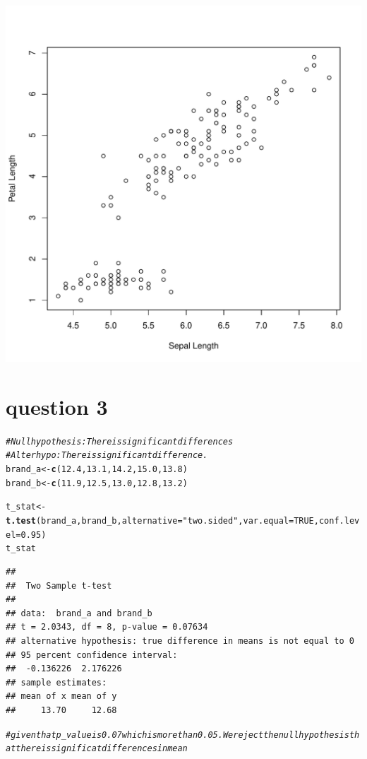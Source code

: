 \documentclass{article}\usepackage[]{graphicx}\usepackage[]{xcolor}
\makeatletter
\def\maxwidth{ %
  \ifdim\Gin@nat@width>\linewidth
    \linewidth
  \else
    \Gin@nat@width
  \fi
}
\newcommand{\hlnum}[1]{\textcolor[rgb]{0.686,0.059,0.569}{#1}}%
\newcommand{\hlsng}[1]{\textcolor[rgb]{0.192,0.494,0.8}{#1}}%
\newcommand{\hlcom}[1]{\textcolor[rgb]{0.678,0.584,0.686}{\textit{#1}}}%
\newcommand{\hldef}[1]{\textcolor[rgb]{0.345,0.345,0.345}{#1}}%
\newcommand{\hlkwb}[1]{\textcolor[rgb]{0.69,0.353,0.396}{#1}}%
\newcommand{\hlkwc}[1]{\textcolor[rgb]{0.333,0.667,0.333}{#1}}%
\newcommand{\hlkwd}[1]{\textcolor[rgb]{0.737,0.353,0.396}{\textbf{#1}}}%
\newenvironment{kframe}{%
 \def\at@end@of@kframe{}%
 \ifinner\ifhmode%
  \def\at@end@of@kframe{\end{minipage}}%
  \begin{minipage}{\columnwidth}%
 \fi\fi%
 \def\FrameCommand##1{\hskip\@totalleftmargin \hskip-\fboxsep
 \colorbox{shadecolor}{##1}\hskip-\fboxsep
     \hskip-\linewidth \hskip-\@totalleftmargin \hskip\columnwidth}%
 \MakeFramed {\advance\hsize-\width
   \@totalleftmargin\z@ \linewidth\hsize
   \@setminipage}}%
 {\par\unskip\endMakeFramed%
 \at@end@of@kframe}
\newenvironment{knitrout}{}{} %
\makeatother
\begin{document}
\begin{knitrout}
\includegraphics[width=\maxwidth]{figure/unnamed-chunk-2-2} 
\end{knitrout}
\section{question 3}
\begin{knitrout}
\color{fgcolor}\begin{kframe}
\begin{alltt}
\hlcom{#Null hypothesis: There is significant differences}
\hlcom{#Alter hypo: There is significant difference.}
\hldef{brand_a} \hlkwb{<-} \hlkwd{c}\hldef{(}\hlnum{12.4}\hldef{,} \hlnum{13.1}\hldef{,} \hlnum{14.2}\hldef{,} \hlnum{15.0}\hldef{,} \hlnum{13.8}\hldef{)}
\hldef{brand_b} \hlkwb{<-} \hlkwd{c}\hldef{(}\hlnum{11.9}\hldef{,} \hlnum{12.5}\hldef{,} \hlnum{13.0}\hldef{,} \hlnum{12.8}\hldef{,} \hlnum{13.2}\hldef{)}

\hldef{t_stat} \hlkwb{<-} \hlkwd{t.test}\hldef{(brand_a, brand_b,} \hlkwc{alternative} \hldef{=} \hlsng{"two.sided"}\hldef{,} \hlkwc{var.equal}\hldef{=}\hlnum{TRUE}\hldef{,} \hlkwc{conf.level} \hldef{=} \hlnum{0.95}\hldef{)}
\hldef{t_stat}
\end{alltt}
\begin{verbatim}
## 
## 	Two Sample t-test
## 
## data:  brand_a and brand_b
## t = 2.0343, df = 8, p-value = 0.07634
## alternative hypothesis: true difference in means is not equal to 0
## 95 percent confidence interval:
##  -0.136226  2.176226
## sample estimates:
## mean of x mean of y 
##     13.70     12.68
\end{verbatim}
\begin{alltt}
\hlcom{# given that p_value is 0.07 which is more than 0.05. We reject the null hypothesis that there is significat differences in mean }
\end{alltt}
\end{kframe}
\end{knitrout}
\end{document}
